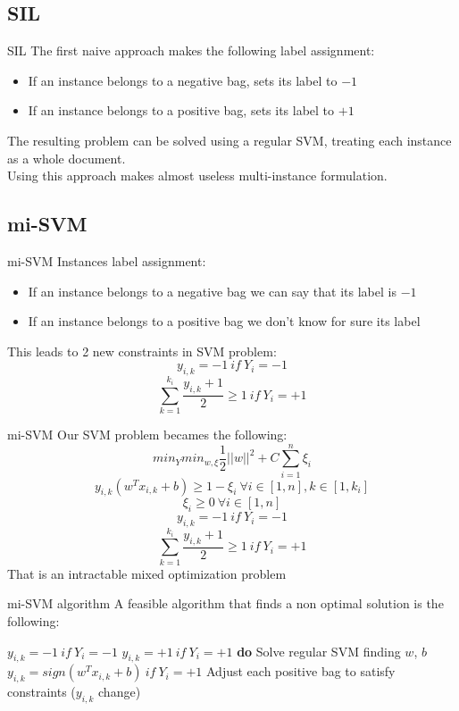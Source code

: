 \subsection{SIL}
\begin{frame}{SIL}
	The first naive approach makes the following label assignment:
	\begin{itemize}\setlength\itemsep{1em}
		\item If an instance belongs to a negative bag, sets its label to $-1$
		\item If an instance belongs to a positive bag, sets its label to $+1$
	\end{itemize}
	\vspace{5px}
	The resulting problem can be solved using a regular SVM, treating each instance as a whole document.\\
	\vspace{12px}
	Using this approach makes almost useless multi-instance formulation.
\end{frame}


\subsection{mi-SVM}
\begin{frame}{mi-SVM}
	Instances label assignment:
	\begin{itemize}\setlength\itemsep{1em}
		\item If an instance belongs to a negative bag we can say that its label is $-1$
		\item If an instance belongs to a positive bag we don't know for sure its label
	\end{itemize}
	\vspace{12px}
	This leads to 2 new constraints in SVM problem:
	$$y_{i,k} = -1 \ if \ Y_i = -1$$
	$$\sum_{k = 1}^{k_i}\frac{y_{i,k} + 1}{2} \geq 1 \ if \ Y_i = +1$$
\end{frame}

\begin{frame}{mi-SVM}
	Our SVM problem becames the following:
	$$min_Y min_{w, \xi} \frac{1}{2} ||w||^2 + C \sum_{i = 1}^{n}\xi_i$$
	$$y_{i,k} (w^T x_{i,k} + b) \geq 1 - \xi_i \ \forall i \in [1, n], k \in [1, k_i]$$
	$$\xi_i \geq 0 \ \forall i \in [1, n]$$
	$$y_{i,k} = -1 \ if \ Y_i = -1$$
	$$\sum_{k = 1}^{k_i}\frac{y_{i,k} + 1}{2} \geq 1 \ if \ Y_i = +1$$
	That is an intractable mixed optimization problem
\end{frame}

\begin{frame}{mi-SVM algorithm}
	A feasible algorithm that finds a non optimal solution is the following:
	
	\begin{codebox}
		\li $y_{i,k} = -1 \ if \ Y_i = -1$
		\li $y_{i,k} = +1 \ if \ Y_i = +1$
		\li \textbf{do} \Do
		\li Solve regular SVM finding $w$, $b$
		\li $y_{i,k} = sign(w^T x_{i,k} + b) \ if \ Y_i = +1$
		\li Adjust each positive bag to satisfy constraints \End
		\li \While($y_{i,k}$ change)
		
	\end{codebox}
	
\end{frame}

